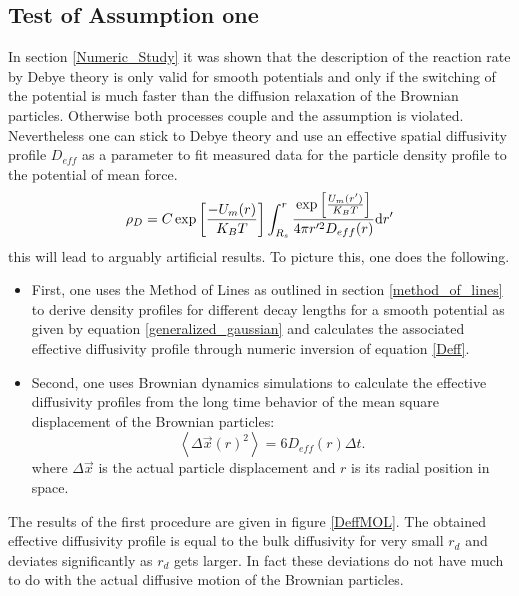 \subsection{Test of Assumption one}
In section \ref{Numeric_Study} it was shown that the description of the reaction rate by Debye theory is only valid for smooth potentials and only if the switching of the potential is much faster than the diffusion relaxation of the Brownian particles. Otherwise both processes couple and the assumption is violated. Nevertheless one can stick to Debye theory and use an effective spatial diffusivity profile $D_{eff}$ as a parameter to fit measured data for the particle density profile to the potential of mean force. 
\begin{equation}
    \rho_D = C \exp\left[\frac{-U_m(r)}{K_B T}\right] \int_{R_s}^{r} \frac{\exp\left[\frac{U_m(r')}{K_B T}\right]}{4 \pi r'^{2} D_{eff}(r)}{\rm d} r'
    \label{Deff}
\end{equation}
this will lead to arguably artificial results. To picture this, one does the following. 
\begin{itemize}
    \item First, one uses the Method of Lines as outlined in section \ref{method_of_lines} to derive density profiles for different decay lengths for a smooth potential as given by equation \eqref{generalized_gaussian} and calculates the associated effective diffusivity profile through numeric inversion of equation \eqref{Deff}. 
    \item Second, one uses Brownian dynamics simulations to calculate the effective diffusivity profiles from the long time behavior of the mean square displacement of the Brownian particles: 
    \begin{equation}
        \left<\Delta \vec{x}(r)^{2}\right> = 6 D_{eff}(r) \Delta t.
        \label{msqd}
    \end{equation}
    where $\Delta \vec{x}$ is the actual particle displacement and $r$ is its radial position in space. \\

\end{itemize}
The results of the first procedure are given in figure \ref{DeffMOL}. The obtained effective diffusivity profile is equal to the bulk diffusivity for very small $r_d$ and deviates significantly as $r_d$ gets larger. In fact these deviations do not have much to do with the actual diffusive motion of the Brownian particles.\vspace{-0.3 cm}\\

